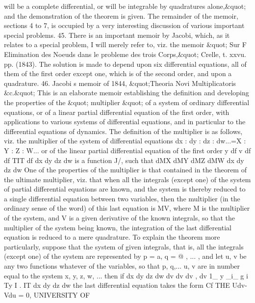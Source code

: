 \documentclass[11pt,a4paper]{book}
\begin{document}

will
be
a
complete
differential,
or
will
be
integrable
by
quadratures
alone,\&quot;
and
the
demonstration
of
the
theorem
is given.
The remainder of
the
memoir,
sections 4
to
7,
is
occupied by
a
very
interesting discussion
of various important
special problems.
45.
There
is
an
important
memoir
by
Jacobi,
which,
as
it
relates
to
a
special
problem,
I
will
merely
refer
to,
viz.
the
memoir
\&quot; Sur
F Elimination
des
Noeuds
dans
le
probleme
des
trois
Corps,\&quot;
Crelle,
t.
xxvu.
pp.
(1843).
The
solution
is
made
to
depend
upon
six
differential
equations,
all
of them
of
the
first
order
except
one, which
is of the second
order, and upon a quadrature.
46.
Jacobi s
memoir
of
1844,
\&quot;Theoria
Novi
Multiplicatoris
\&c.\&quot;
This
is
an
elaborate
memoir
establishing
the
definition
and
developing
the
properties
of
the
\&quot;
multiplier
\&quot;
of
a
system
of
ordinary
differential
equations,
or
of
a
linear
partial
differential equation of the
first
order,
with
applications
to various systems of
differential
equations,
and
in
particular
to
the
differential
equations
of
dynamics.
The
definition
of the
multiplier
is
as
follows,
viz. the
multiplier of the system
of differential equations
dx
: dy
: dz
: dw...=X
: Y
: Z
:
W...
or of the
linear
partial
differential equation
of the
first order
y df
v df
df
TIT df
dx
dy
dz
dw
is a function
J/, such
that
dMX
dMY
dMZ
dMW
dx
dy
dz
dw
One
of
the
properties
of
the
multiplier
is
that
contained
in
the
theorem
of
the
ultimate
multiplier,
viz.
that when
all
the
integrals
(except
one)
of
the
system
of
partial
differential
equations
are
known, and
the
system
is thereby reduced
to
a single
differential
equation
between
two
variables,
then
the
multiplier
(in
the
ordinary
sense
of
the
word)
of
this
last
equation
is MV,
where M
is
the
multiplier
of the
system,
and V
is
a
given
derivative
of
the
known
integrals,
so
that
the
multiplier
of
the
system
being known,
the
integration
of
the
last
differential
equation
is
reduced
to
a
mere
quadrature.
To
explain
the
theorem
more
particularly,
suppose
that
the
system
of given
integrals,
that
is,
all
the
integrals
(except
one)
of
the system
are
represented
by p = a,
q = @
,
...
,
and
let
u,
v
be any
two
functions
whatever
of
the
variables,
so
that p,
q,...
u,
v are
in number equal
to the system
x,
y,
z,
w,
...
then
if
dx
dy
dz
dw
dv
dv
dv
,
dv
1_ y
_i_ g
i
Ty
I
.
IT
dx
dy
dz
dw
the
last
differential equation takes the form
Cf THE
Udv-Vdu = 0,
UNIVERSITY
OF

\end{document}
